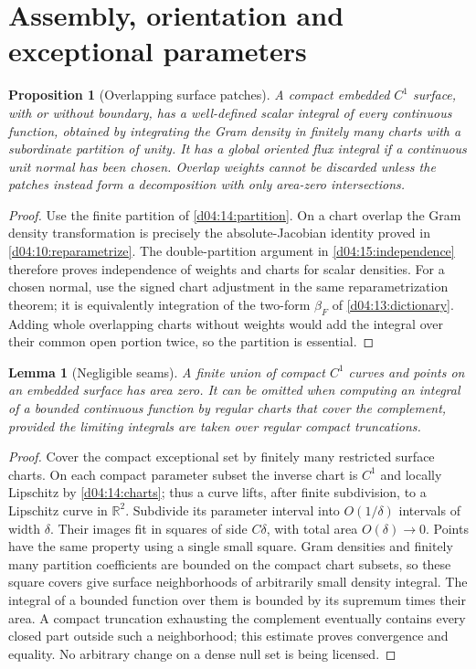 \documentclass[11pt,oneside,openany]{book}
\newtheorem{lemma}[theorem]{Lemma}
\newtheorem{proposition}[theorem]{Proposition}
\theoremstyle{definition}
\theoremstyle{remark}
\newcommand{\R}{\mathbb R}
\newcommand{\family}[1]{}
\begin{document}
\section{Assembly, orientation and exceptional parameters}
\family{K04.10.07}\family{K04.10.08}\family{K04.10.09}
\begin{proposition}[Overlapping surface patches]\label{d04:10:assembly}
A compact embedded $C^1$ surface, with or without boundary, has a
well-defined scalar integral of every continuous function, obtained by
integrating the Gram density in finitely many charts with a subordinate
partition of unity. It has a global oriented flux integral if a continuous
unit normal has been chosen. Overlap weights cannot be discarded unless
the patches instead form a decomposition with only area-zero intersections.
\end{proposition}
\begin{proof}
Use the finite partition of \cref{d04:14:partition}. On a chart overlap
the Gram density transformation is precisely the absolute-Jacobian identity
proved in \cref{d04:10:reparametrize}. The double-partition argument in
\cref{d04:15:independence} therefore proves independence of weights and
charts for scalar densities. For a chosen normal, use the signed chart
adjustment in the same reparametrization theorem; it is equivalently
integration of the two-form $\beta_F$ of \cref{d04:13:dictionary}.
Adding whole overlapping charts without weights would add the integral
over their common open portion twice, so the partition is essential.
\end{proof}

\begin{lemma}[Negligible seams]\label{d04:10:seams}
A finite union of compact $C^1$ curves and points on an embedded surface
has area zero. It can be omitted when computing an integral of a bounded
continuous function by regular charts that cover the complement, provided
the limiting integrals are taken over regular compact truncations.
\end{lemma}
\begin{proof}
Cover the compact exceptional set by finitely many restricted surface
charts. On each compact parameter subset the inverse chart is $C^1$ and
locally Lipschitz by \cref{d04:14:charts}; thus a curve lifts, after finite
subdivision, to a Lipschitz curve in $\R^2$. Subdivide its parameter interval
into $O(1/\delta)$ intervals of width $\delta$. Their images fit in squares
of side $C\delta$, with total area $O(\delta)\to0$.
Points have the same property using a single small square. Gram densities
and finitely many partition coefficients are bounded on the compact chart
subsets, so these square covers give surface neighborhoods of arbitrarily
small density integral. The integral of a bounded function over them is
bounded by its supremum times their area. A compact truncation exhausting
the complement eventually contains every closed part outside such a
neighborhood; this estimate proves convergence and equality. No arbitrary
change on a dense null set is being licensed.
\end{proof}
\end{document}
